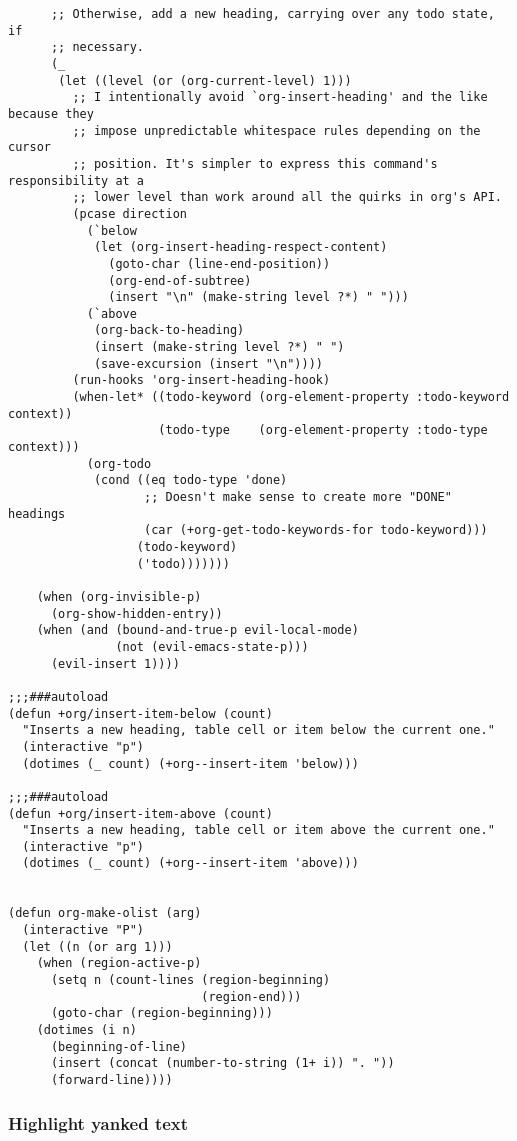 \documentclass[11pt]{article}
\begin{document}
\begin{verbatim}
      ;; Otherwise, add a new heading, carrying over any todo state, if
      ;; necessary.
      (_
       (let ((level (or (org-current-level) 1)))
         ;; I intentionally avoid `org-insert-heading' and the like because they
         ;; impose unpredictable whitespace rules depending on the cursor
         ;; position. It's simpler to express this command's responsibility at a
         ;; lower level than work around all the quirks in org's API.
         (pcase direction
           (`below
            (let (org-insert-heading-respect-content)
              (goto-char (line-end-position))
              (org-end-of-subtree)
              (insert "\n" (make-string level ?*) " ")))
           (`above
            (org-back-to-heading)
            (insert (make-string level ?*) " ")
            (save-excursion (insert "\n"))))
         (run-hooks 'org-insert-heading-hook)
         (when-let* ((todo-keyword (org-element-property :todo-keyword context))
                     (todo-type    (org-element-property :todo-type context)))
           (org-todo
            (cond ((eq todo-type 'done)
                   ;; Doesn't make sense to create more "DONE" headings
                   (car (+org-get-todo-keywords-for todo-keyword)))
                  (todo-keyword)
                  ('todo)))))))

    (when (org-invisible-p)
      (org-show-hidden-entry))
    (when (and (bound-and-true-p evil-local-mode)
               (not (evil-emacs-state-p)))
      (evil-insert 1))))

;;;###autoload
(defun +org/insert-item-below (count)
  "Inserts a new heading, table cell or item below the current one."
  (interactive "p")
  (dotimes (_ count) (+org--insert-item 'below)))

;;;###autoload
(defun +org/insert-item-above (count)
  "Inserts a new heading, table cell or item above the current one."
  (interactive "p")
  (dotimes (_ count) (+org--insert-item 'above)))


(defun org-make-olist (arg)
  (interactive "P")
  (let ((n (or arg 1)))
    (when (region-active-p)
      (setq n (count-lines (region-beginning)
                           (region-end)))
      (goto-char (region-beginning)))
    (dotimes (i n)
      (beginning-of-line)
      (insert (concat (number-to-string (1+ i)) ". "))
      (forward-line))))
\end{verbatim}
\subsubsection{Highlight yanked text}
\label{sec:orga7b74a9}
\end{document}
